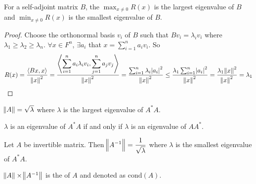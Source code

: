 \begin{theorem}
For a self-adjoint matrix $B$, the $\displaystyle \max_{x \neq 0} R(x)$ is the largest eigenvalue of $B$ and $\displaystyle \min_{x \neq 0} R(x)$ is the smallest eigenvalue of $B$.
\end{theorem}
\begin{proof}
    Choose the orthonormal basis $v_i$ of $B$ such that $Bv_i = \lambda_i v_i$ where $\lambda_1 \geq \lambda_2 \geq \lambda_n$. $\forall x \in F^n$, $\exists a_i$ that $\displaystyle x = \sum_{i=1}^n a_i v_i$. So
    \begin{equation*}
        R(x) = \frac{\left\langle \displaystyle Bx, x \right\rangle}{\norm{x}^2} = \frac{\left\langle \displaystyle \sum_{i=1}^n a_i \lambda_i v_i, \sum_{j=1}^n a_j v_j \right\rangle}{\norm{x}^2} = \frac{\sum_{i=1}^n \lambda_i \abs{a_i}^2}{\norm{x}^2} \leq \frac{\lambda_1 \sum_{i=1}^n \abs{a_i}^2}{\norm{x}^2} = \frac{\lambda_1 \norm{x}^2}{\norm{x}^2} = \lambda_1
    \end{equation*}
\end{proof}

\begin{theorem}
    $\norm{A} = \sqrt{\lambda}$ where $\lambda$ is the largest eigenvalue of $A^* A$.
\end{theorem}

\begin{theorem}
    $\lambda$ is an eigenvalue of $A^* A$ if and only if $\lambda$ is an eigenvalue of $AA^*$.
\end{theorem}

\begin{theorem}
    Let $A$ be invertible matrix. Then $\displaystyle \norm{A^{-1}} = \frac{1}{\sqrt{\lambda}}$ where $\lambda$ is the smallest eigenvalue of $A^*A$.
\end{theorem}

\begin{definition}
    $\norm{A} \times \norm{A^{-1}}$ is the  of $A$ and denoted as $\text{cond}(A)$.
\end{definition}


